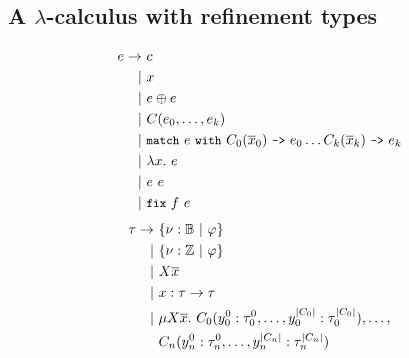 \subsection{A $\lambda$-calculus with refinement types}
\label{sec:rtlc}
\begin{figure*}[t]
  \begin{floatrow}[2]
    {  \begin{align*}
        e \rightarrow &\ c \\
        | &\ x \\
        | &\ e \oplus e \\
        | &\ C(e_0, \ldots, e_k) \\
        | &\ \cc{match}\ e\ \cc{with}\ %
        C_0(\overline{x}_0)\ \cc{->}\ e_0 %
        \ldots %
        C_k(\overline{x}_k)\ \cc{->}\ e_k \\
        | &\ \lambda x.\ e \\
        | &\ e\ e \\
        | &\ \fix{ f }{ e }
      \end{align*} }
    { \begin{align*} %
        \tau \rightarrow &\ \setformer{ \nu : \bools }{ \varphi } \\
        | &\ \setformer{ \nu : \ints}{ \varphi } \\
        | &\ X \overline{x} \\
        | &\ x : \tau \rightarrow \tau \\
        | &\ \mu X \overline{x}.\ %
        C_0(y_0^0 : \tau_0^0, \ldots, %
        y_0^{ \arityof{C_0} } : \tau_0^{ \arityof{C_0} }), %
        \ldots, \\
        &\ C_n(y_n^0 : \tau_n^0, \ldots, %
        y_n^{ \arityof{C_n} } : \tau_n^{ \arityof{C_n} })
      \end{align*} }
  \end{floatrow}
\end{figure*}

